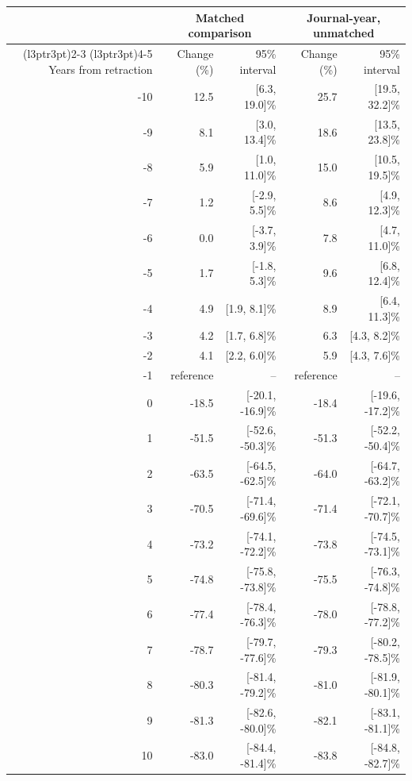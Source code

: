 
\begin{tabular}[t]{rrrrr}
\toprule
\multicolumn{1}{c}{ } & \multicolumn{2}{c}{Matched comparison} & \multicolumn{2}{c}{Journal-year, unmatched} \\
\cmidrule(l{3pt}r{3pt}){2-3} \cmidrule(l{3pt}r{3pt}){4-5}
Years from retraction & Change (\%) & 95\% interval & Change (\%)  & 95\% interval \\
\midrule
-10 & 12.5 & {}[6.3, 19.0]\% & 25.7 & {}[19.5, 32.2]\%\\
-9 & 8.1 & {}[3.0, 13.4]\% & 18.6 & {}[13.5, 23.8]\%\\
-8 & 5.9 & {}[1.0, 11.0]\% & 15.0 & {}[10.5, 19.5]\%\\
-7 & 1.2 & {}[-2.9, 5.5]\% & 8.6 & {}[4.9, 12.3]\%\\
-6 & 0.0 & {}[-3.7, 3.9]\% & 7.8 & {}[4.7, 11.0]\%\\
-5 & 1.7 & {}[-1.8, 5.3]\% & 9.6 & {}[6.8, 12.4]\%\\
-4 & 4.9 & {}[1.9, 8.1]\% & 8.9 & {}[6.4, 11.3]\%\\
-3 & 4.2 & {}[1.7, 6.8]\% & 6.3 & {}[4.3, 8.2]\%\\
-2 & 4.1 & {}[2.2, 6.0]\% & 5.9 & {}[4.3, 7.6]\%\\
-1 & reference & -- & reference & --\\
0 & -18.5 & {}[-20.1, -16.9]\% & -18.4 & {}[-19.6, -17.2]\%\\
1 & -51.5 & {}[-52.6, -50.3]\% & -51.3 & {}[-52.2, -50.4]\%\\
2 & -63.5 & {}[-64.5, -62.5]\% & -64.0 & {}[-64.7, -63.2]\%\\
3 & -70.5 & {}[-71.4, -69.6]\% & -71.4 & {}[-72.1, -70.7]\%\\
4 & -73.2 & {}[-74.1, -72.2]\% & -73.8 & {}[-74.5, -73.1]\%\\
5 & -74.8 & {}[-75.8, -73.8]\% & -75.5 & {}[-76.3, -74.8]\%\\
6 & -77.4 & {}[-78.4, -76.3]\% & -78.0 & {}[-78.8, -77.2]\%\\
7 & -78.7 & {}[-79.7, -77.6]\% & -79.3 & {}[-80.2, -78.5]\%\\
8 & -80.3 & {}[-81.4, -79.2]\% & -81.0 & {}[-81.9, -80.1]\%\\
9 & -81.3 & {}[-82.6, -80.0]\% & -82.1 & {}[-83.1, -81.1]\%\\
10 & -83.0 & {}[-84.4, -81.4]\% & -83.8 & {}[-84.8, -82.7]\%\\
\bottomrule
\end{tabular}
